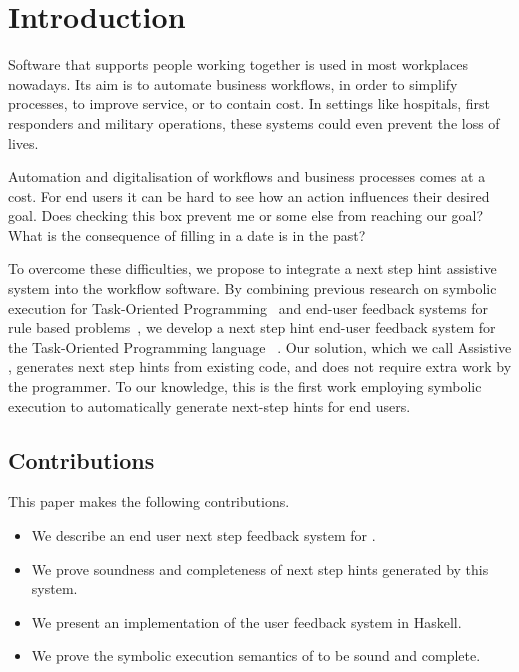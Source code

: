 
\section{Introduction}
\label{sec:intro}

Software that supports people working together is used in most workplaces nowadays.
Its aim is to automate business workflows, in order to simplify processes, to improve service, or to contain cost.
In settings like hospitals, first responders and military operations, these systems could even prevent the loss of lives.


Automation and digitalisation of workflows and business processes comes at a cost.
For end users it can be hard to see how an action influences their desired goal.
Does checking this box prevent me or some else from reaching our goal?
What is the consequence of filling in a date is in the past?

To overcome these difficulties, we propose to integrate a next step hint assistive system into the workflow software.
By combining previous research on symbolic execution for Task-Oriented Programming~\cite{Naus2019} and end-user feedback systems for rule based problems~\cite{DBLP:conf/sfp/NausJ16},
we develop a next step hint end-user feedback system for the Task-Oriented Programming language \TOPHAT~\cite{DBLP:conf/ppdp/SteenvoordenNK19}.
Our solution, which we call Assistive \TOPHAT, generates next step hints from existing code, and does not require extra work by the programmer.
To our knowledge, this is the first work employing symbolic execution to automatically generate next-step hints for end users.

\subsection{Contributions}

This paper makes the following contributions.

\begin{itemize}
  \item We describe an end user next step feedback system for \TOPHAT.
  \item We prove soundness and completeness of next step hints generated by this system.
  \item We present an implementation of the user feedback system in Haskell.
  \item We prove the symbolic execution semantics of \TOPHAT to be sound and complete.
\end{itemize}


